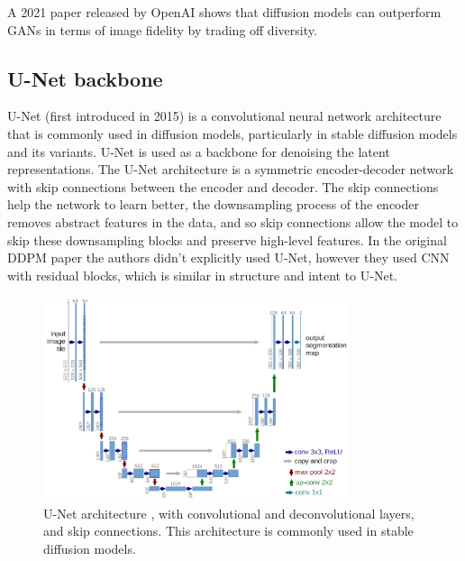 A 2021 paper released by OpenAI \cite{openai_diffusion_beats_gans} shows that diffusion models can outperform GANs in terms of image fidelity by trading off diversity.














\subsection{U-Net backbone}

U-Net (first introduced in 2015) \cite{unet} is a convolutional neural network architecture that is commonly used in diffusion models, particularly in stable diffusion models and its variants. U-Net is used as a backbone for denoising the latent representations. The U-Net architecture is a symmetric encoder-decoder network with skip connections between the encoder and decoder. The skip connections help the network to learn better, the downsampling process of the encoder removes abstract features in the data, and so skip connections allow the model to skip these downsampling blocks and preserve high-level features. In the original DDPM paper \cite{ddpm} the authors didn't explicitly used U-Net, however they used CNN with residual blocks, which is similar in structure and intent to U-Net. 

\begin{figure}
    \centering
    \includegraphics[width=0.8\textwidth]{images/diffusion_models/stable_diffusion/u-net-architecture.png}
    \caption{U-Net architecture \cite{unet}, with convolutional and deconvolutional layers, and skip connections. This architecture is commonly used in stable diffusion models.}
    \label{fig:unet_architecture}
\end{figure}

